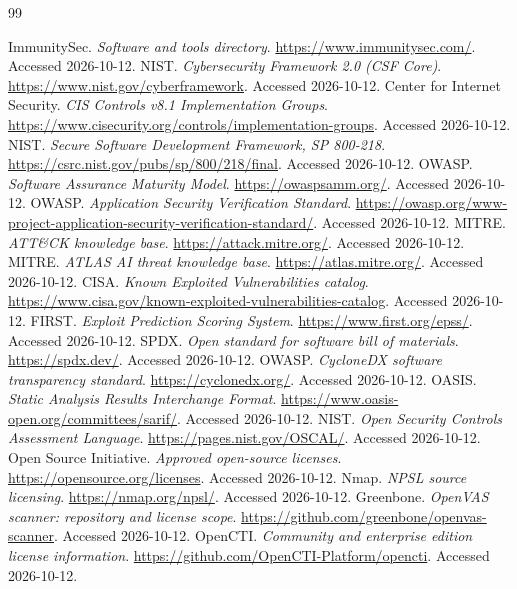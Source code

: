 \documentclass[11pt,oneside]{report}
\begin{document}
\begin{thebibliography}{99}
\raggedright
{}

 ImmunitySec. \emph{Software and tools directory}. \url{https://www.immunitysec.com/}. Accessed 2026-10-12.
 NIST. \emph{Cybersecurity Framework 2.0 (CSF Core)}. \url{https://www.nist.gov/cyberframework}. Accessed 2026-10-12.
 Center for Internet Security. \emph{CIS Controls v8.1 Implementation Groups}. \url{https://www.cisecurity.org/controls/implementation-groups}. Accessed 2026-10-12.
 NIST. \emph{Secure Software Development Framework, SP 800-218}. \url{https://csrc.nist.gov/pubs/sp/800/218/final}. Accessed 2026-10-12.
 OWASP. \emph{Software Assurance Maturity Model}. \url{https://owaspsamm.org/}. Accessed 2026-10-12.
 OWASP. \emph{Application Security Verification Standard}. \url{https://owasp.org/www-project-application-security-verification-standard/}. Accessed 2026-10-12.
 MITRE. \emph{ATT\&CK knowledge base}. \url{https://attack.mitre.org/}. Accessed 2026-10-12.
 MITRE. \emph{ATLAS AI threat knowledge base}. \url{https://atlas.mitre.org/}. Accessed 2026-10-12.
 CISA. \emph{Known Exploited Vulnerabilities catalog}. \url{https://www.cisa.gov/known-exploited-vulnerabilities-catalog}. Accessed 2026-10-12.
 FIRST. \emph{Exploit Prediction Scoring System}. \url{https://www.first.org/epss/}. Accessed 2026-10-12.
 SPDX. \emph{Open standard for software bill of materials}. \url{https://spdx.dev/}. Accessed 2026-10-12.
 OWASP. \emph{CycloneDX software transparency standard}. \url{https://cyclonedx.org/}. Accessed 2026-10-12.
 OASIS. \emph{Static Analysis Results Interchange Format}. \url{https://www.oasis-open.org/committees/sarif/}. Accessed 2026-10-12.
 NIST. \emph{Open Security Controls Assessment Language}. \url{https://pages.nist.gov/OSCAL/}. Accessed 2026-10-12.
 Open Source Initiative. \emph{Approved open-source licenses}. \url{https://opensource.org/licenses}. Accessed 2026-10-12.
 Nmap. \emph{NPSL source licensing}. \url{https://nmap.org/npsl/}. Accessed 2026-10-12.
 Greenbone. \emph{OpenVAS scanner: repository and license scope}. \url{https://github.com/greenbone/openvas-scanner}. Accessed 2026-10-12.
 OpenCTI. \emph{Community and enterprise edition license information}. \url{https://github.com/OpenCTI-Platform/opencti}. Accessed 2026-10-12.

\end{thebibliography}
\end{document}
